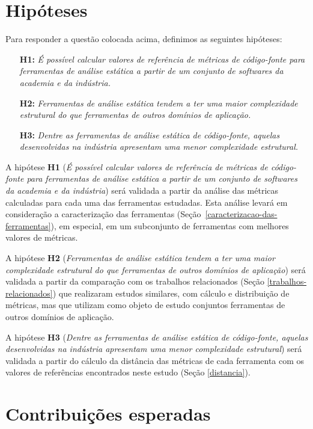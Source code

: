 \section{Hipóteses} \label{hipoteses}

Para responder a questão colocada acima, definimos as seguintes hipóteses:

\begin{enumerate}
  \item[{\bf H1:}] {\em É possível calcular valores de referência de métricas
    de código-fonte para ferramentas de análise estática a partir de um
    conjunto de softwares da academia e da indústria.}
  \item[{\bf H2:}] {\em Ferramentas de análise estática tendem a ter uma
    maior complexidade estrutural do que ferramentas de outros domínios de
    aplicação.}
  \item[{\bf H3:}] {\em Dentre as ferramentas de análise estática de
    código-fonte, aquelas desenvolvidas na indústria apresentam uma menor
    complexidade estrutural.}
\end{enumerate}

A hipótese {\bf H1} ({\em É possível calcular valores de referência de
métricas de código-fonte para ferramentas de análise estática a partir de um
conjunto de softwares da academia e da indústria}) será validada a partir da
análise das métricas calculadas para cada uma das ferramentas estudadas.  Esta
análise levará em consideração a caracterização das ferramentas
(Seção~\ref{caracterizacao-das-ferramentas}), em especial, em um subconjunto
de ferramentas com melhores valores de métricas.

A hipótese {\bf H2} ({\em Ferramentas de análise estática tendem a ter uma
maior complexidade estrutural do que ferramentas de outros domínios de
aplicação}) será validada a partir da comparação com os trabalhos relacionados
(Seção \ref{trabalhos-relacionados}) que realizaram estudos similares, com
cálculo e distribuição de métricas, mas que utilizam como objeto de estudo
conjuntos ferramentas de outros domínios de aplicação.

A hipótese {\bf H3} ({\em Dentre as ferramentas de análise estática de
código-fonte, aquelas desenvolvidas na indústria apresentam uma menor
complexidade estrutural}) será validada a partir do cálculo da distância das
métricas de cada ferramenta com os valores de referências encontrados neste
estudo (Seção \ref{distancia}).


\section{Contribuições esperadas}

